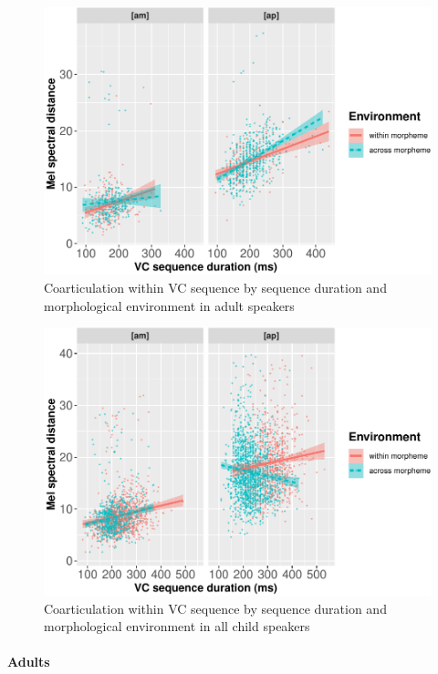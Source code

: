 \documentclass[
]{article}
\begin{document}
~
~

\begin{figure}
\centering
\includegraphics{supp_analysis_files/figure-latex/adult-int-plot-1.pdf}
\caption{\label{fig:adult-int-plot}Coarticulation within VC sequence by sequence duration and morphological environment in adult speakers}
\end{figure}

\begin{figure}
\centering
\includegraphics{supp_analysis_files/figure-latex/child-int-plot-1.pdf}
\caption{\label{fig:child-int-plot}Coarticulation within VC sequence by sequence duration and morphological environment in all child speakers}
\end{figure}

\hypertarget{adults}{%
\paragraph{Adults}\label{adults}}
\end{document}
